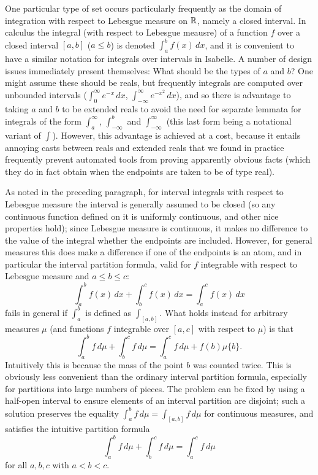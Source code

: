 \documentclass[leqno]{article}
\theoremstyle{definition}
\begin{document}
One particular type of set occurs particularly frequently as the domain of integration with respect to Lebesgue measure on $\mathbb{R}$, namely a closed interval. In calculus the integral (with respect to Lebesgue meausre) of a function $f$ over a closed interval $[a,b]$ ($a \le b$) is denoted $\int_a^b f(x) \, dx$, and it is convenient to have a similar notation for integrals over intervals in Isabelle. A number of design issues immediately present themselves: What should be the types of $a$ and $b$? One might assume these should be reals, but frequently integrals are computed over unbounded intervals ($\int_0^\infty e^{-x} \, dx$, $\int_{-\infty}^\infty e^{-x^2} \, dx$), and so there is advantage to taking $a$ and $b$ to be extended reals to avoid the need for separate lemmata for integrals of the form $\int_a^\infty$, $\int_{-\infty}^b$ and $\int_{-\infty}^\infty$ (this last form being a notational variant of $\int$). However, this advantage is achieved at a cost, because it entails annoying casts between reals and extended reals that we found in practice frequently prevent automated tools from proving apparently obvious facts (which they do in fact obtain when the endpoints are taken to be of type real).

As noted in the preceding paragraph, for interval integrals with respect to Lebesgue measure the interval is generally assumed to be closed (so any continuous function defined on it is uniformly continuous, and other nice properties hold); since Lebesgue measure is continuous, it makes no difference to the value of the integral whether the endpoints are included. However, for general measures this does make a difference if one of the endpoints is an atom, and in particular the interval partition formula, valid for $f$ integrable with respect to Lebesgue measure and $a \le b \le c$:
\[ \int_a^b f(x) \, dx + \int_b^c f(x) \, dx = \int_a^c f(x) \, dx \]
fails in general if $\int_a^b$ is defined as $\int_{[a,b]}$. What holds instead for arbitrary measures $\mu$ (and functions $f$ integrable over $[a,c]$ with respect to $\mu$) is that
\[ \int_a^b f \, d\mu + \int_b^c f \, d\mu = \int_a^c f \, d\mu + f(b)\mu \{b\}. \]
Intuitively this is because the mass of the point $b$ was counted twice. This is obviously less convenient than the ordinary interval partition formula, especially for partitions into large numbers of pieces. The problem can be fixed by using a half-open interval to ensure elements of an interval partition are disjoint; such a solution preserves the equality $\int_a^b f \, d\mu = \int_{[a,b]} f \, d\mu$ for continuous measures, and satisfies the intuitive partition formula
\[ \int_a^b f \, d\mu + \int_b^c f \, d\mu = \int_a^c f \, d\mu \]
for all $a,b,c$ with $a < b < c$.
\end{document}
